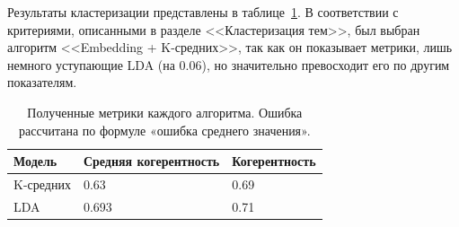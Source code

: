 \documentclass[14pt,a4paper]{article}
\begin{document}
Результаты кластеризации представлены в таблице~\ref{tab:ClusteringPivotTable}. В соответствии с критериями, описанными в разделе <<Кластеризация тем>>, был выбран алгоритм <<Embedding + K-средних>>, так как он показывает метрики, лишь немного уступающие LDA (на 0.06), но значительно превосходит его по другим показателям.



\begin{table}[h]
\centering
\small
\begin{tabular}{|l|l|l|}
\hline
\textbf{Модель} & \textbf{Средняя когерентность} & \multicolumn{1}{c|}{\textbf{Когерентность}} \\ \hline
K-средних        & 0.63                & 0.69                                    \\ \hline
LDA            & 0.693          & 0.71                                    \\ \hline
\end{tabular}
\caption{Полученные метрики каждого алгоритма. Ошибка рассчитана по формуле «ошибка среднего значения».
}
\label{tab:ClusteringPivotTable}
\end{table}





\end{document}
